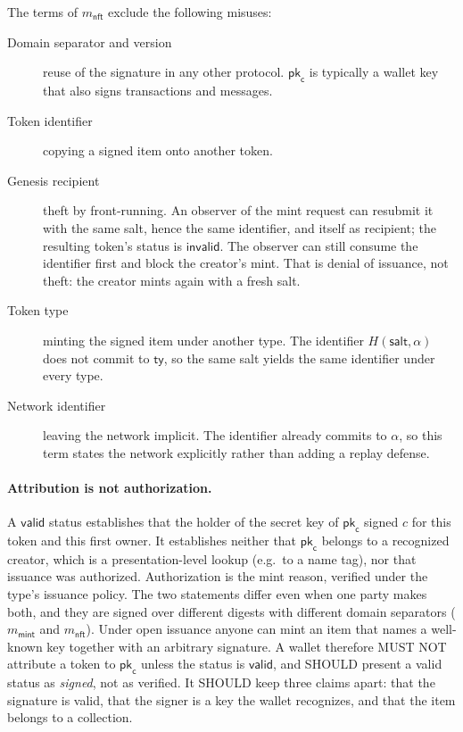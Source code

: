 The terms of $m_\mathsf{nft}$ exclude the following misuses:
\begin{description}
	\item[Domain separator and version] reuse of the signature in any other protocol. $\mathsf{pk}_\mathsf{c}$ is typically a wallet key that also signs transactions and messages.
	\item[Token identifier] copying a signed item onto another token.
	\item[Genesis recipient] theft by front-running. An observer of the mint request can resubmit it with the same salt, hence the same identifier, and itself as recipient; the resulting token's status is $\mathsf{invalid}$. The observer can still consume the identifier first and block the creator's mint. That is denial of issuance, not theft: the creator mints again with a fresh salt.
	\item[Token type] minting the signed item under another type. The identifier $H(\mathsf{salt}, \alpha)$ does not commit to $\mathsf{ty}$, so the same salt yields the same identifier under every type.
	\item[Network identifier] leaving the network implicit. The identifier already commits to $\alpha$, so this term states the network explicitly rather than adding a replay defense.
\end{description}

\paragraph{Attribution is not authorization.} A $\mathsf{valid}$ status establishes that the holder of the secret key of $\mathsf{pk}_\mathsf{c}$ signed $c$ for this token and this first owner. It establishes neither that $\mathsf{pk}_\mathsf{c}$ belongs to a recognized creator, which is a presentation-level lookup (e.g.\ to a name tag), nor that issuance was authorized. Authorization is the mint reason, verified under the type's issuance policy. The two statements differ even when one party makes both, and they are signed over different digests with different domain separators ($m_\mathsf{mint}$ and $m_\mathsf{nft}$). Under open issuance anyone can mint an item that names a well-known key together with an arbitrary signature. A wallet therefore MUST NOT attribute a token to $\mathsf{pk}_\mathsf{c}$ unless the status is $\mathsf{valid}$, and SHOULD present a valid status as \emph{signed}, not as verified. It SHOULD keep three claims apart: that the signature is valid, that the signer is a key the wallet recognizes, and that the item belongs to a collection.

